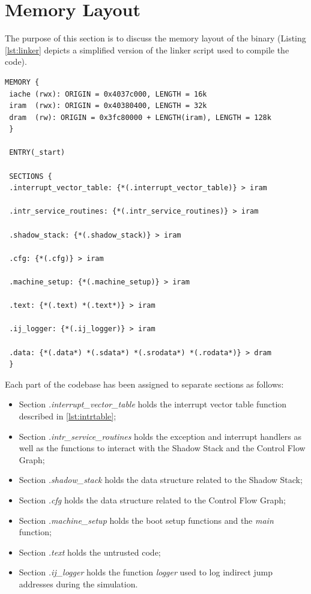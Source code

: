 \section{Memory Layout}
\label{sec:layout}

The purpose of this section is to discuss the memory layout of the binary (Listing
\ref{lst:linker} depicts a simplified version of the linker script used to compile
the code). \\ \begin{lstlisting}[style=CStyle, caption= Simplified linker script, label={lst:linker}]
 MEMORY {
 iache (rwx): ORIGIN = 0x4037c000, LENGTH = 16k
 iram  (rwx): ORIGIN = 0x40380400, LENGTH = 32k
 dram  (rw): ORIGIN = 0x3fc80000 + LENGTH(iram), LENGTH = 128k
 }

 ENTRY(_start)

 SECTIONS {
 .interrupt_vector_table: {*(.interrupt_vector_table)} > iram

 .intr_service_routines: {*(.intr_service_routines)} > iram

 .shadow_stack: {*(.shadow_stack)} > iram

 .cfg: {*(.cfg)} > iram

 .machine_setup: {*(.machine_setup)} > iram

 .text: {*(.text) *(.text*)} > iram

 .ij_logger: {*(.ij_logger)} > iram

 .data: {*(.data*) *(.sdata*) *(.srodata*) *(.rodata*)} > dram
 }
\end{lstlisting}

Each part of the codebase has been assigned to separate sections as follows:
\begin{itemize}
  \item Section \textit{.interrupt\_vector\_table} holds the interrupt vector
    table function described in \ref{lst:intrtable};

  \item Section \textit{.intr\_service\_routines} holds the exception and
    interrupt handlers as well as the functions to interact with the Shadow
    Stack and the Control Flow Graph;

  \item Section \textit{.shadow\_stack} holds the data structure related to the
    Shadow Stack;

  \item Section \textit{.cfg} holds the data structure related to the Control
    Flow Graph;

  \item Section \textit{.machine\_setup} holds the boot setup functions and the
    \textit{main} function;

  \item Section \textit{.text} holds the untrusted code;

  \item Section \textit{.ij\_logger} holds the function \textit{logger} used to log
    indirect jump addresses during the simulation.
\end{itemize}

